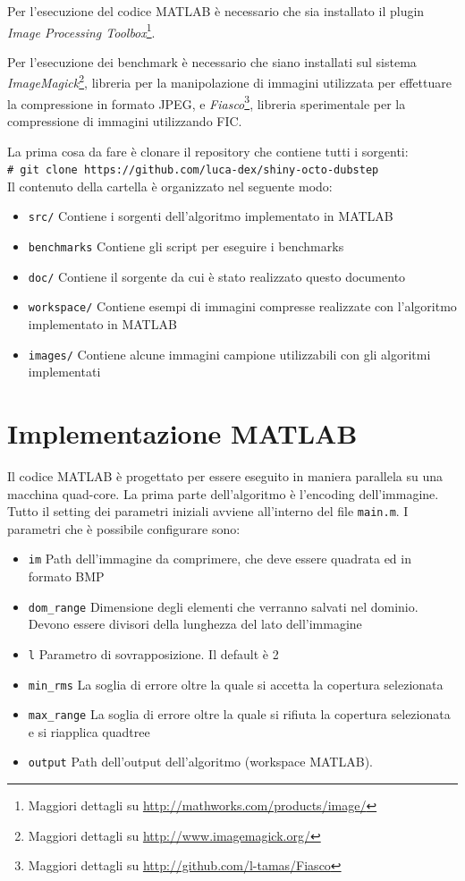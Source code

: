 \documentclass[11pt,a4paper,appendixprefix=true,numbers=noenddot]{scrreprt}
\newcommand{\shellcmd}[1]{\\\indent\indent\texttt{\footnotesize\# #1}\\}
\begin{document}
Per l'esecuzione del codice MATLAB è necessario che sia installato il plugin \textit{Image Processing Toolbox}\footnote{Maggiori dettagli su \url{http://mathworks.com/products/image/}}.

Per l'esecuzione dei benchmark è necessario che siano installati sul sistema \textit{ImageMagick}\footnote{Maggiori dettagli su \url{http://www.imagemagick.org/}}, libreria per la manipolazione di immagini utilizzata per effettuare la compressione in formato JPEG, e \textit{Fiasco}\footnote{Maggiori dettagli su \url{http://github.com/l-tamas/Fiasco}}, libreria sperimentale per la compressione di immagini utilizzando FIC.

\noindent La prima cosa da fare è clonare il repository che contiene tutti i sorgenti:
\shellcmd{git clone https://github.com/luca-dex/shiny-octo-dubstep}

Il contenuto della cartella è organizzato nel seguente modo:

\begin{itemize}
\item \texttt{src/} Contiene i sorgenti dell'algoritmo implementato in MATLAB
\item \texttt{benchmarks} Contiene gli script per eseguire i benchmarks
\item \texttt{doc/} Contiene il sorgente da cui è stato realizzato questo documento
\item \texttt{workspace/} Contiene esempi di immagini compresse realizzate con l'algoritmo implementato in MATLAB
\item \texttt{images/} Contiene alcune immagini campione utilizzabili con gli algoritmi implementati
\end{itemize}

\section{Implementazione MATLAB}

Il codice MATLAB è progettato per essere eseguito in maniera parallela su una macchina quad-core. La prima parte dell'algoritmo è l'encoding dell'immagine. Tutto il setting dei parametri iniziali avviene all'interno del file \texttt{main.m}. I parametri che è possibile configurare sono:

\begin{itemize}
\item \texttt{im} Path dell'immagine da comprimere, che deve essere quadrata ed in formato BMP
\item \texttt{dom\_range} Dimensione degli elementi che verranno salvati nel dominio. Devono essere divisori della lunghezza del lato dell'immagine
\item \texttt{l} Parametro di sovrapposizione. Il default è 2
\item \texttt{min\_rms} La soglia di errore oltre la quale si accetta la copertura selezionata
\item \texttt{max\_range} La soglia di errore oltre la quale si rifiuta la copertura selezionata e si riapplica quadtree 
\item \texttt{output} Path dell'output dell'algoritmo (workspace MATLAB).
\end{itemize}
\end{document}
